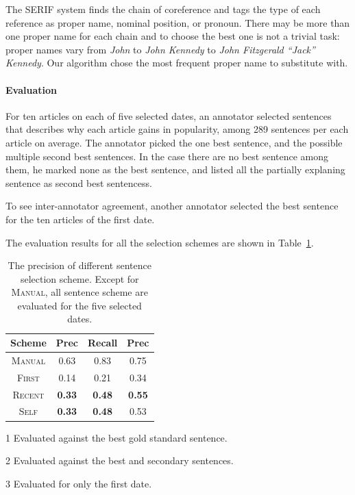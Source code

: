 \documentclass[11pt]{article}
\begin{document}
The SERIF system finds the chain of coreference and tags the type of each reference
as proper name, nominal position, or pronoun.
There may be more than one proper name for each chain and to choose the best one
is not a trivial task: proper names vary from \textit{John} to \textit{John Kennedy} to \textit{John Fitzgerald ``Jack'' Kennedy}.
Our algorithm chose the most frequent proper name to substitute with.

\paragraph {Evaluation}
For ten articles on each of five selected dates, an annotator selected sentences that describes why each article gains in popularity,
among 289 sentences per each article on average.
The annotator picked the one best sentence, and the possible multiple second best sentences.
In the case there are no best sentence among them, he marked none as the best sentence,
and listed all the partially explaning sentence as second best sentencess.

To see inter-annotator agreement, another annotator selected the best sentence for the ten articles of the first date.

The evaluation results for all the selection schemes are shown in Table~\ref{tab:sentence-selection-results}.

\begin{table}
	\centering
	\begin{threeparttable}
		\begin{varwidth}{\textwidth}
			\begin{tabular}{cccc}
				Scheme & Prec\tnote{1} & Recall\tnote{1} & Prec\tnote{2} \\
				\hline
				\textsc{Manual}\tnote{3} & \small 0.63 & \small 0.83 & \small 0.75 \\
				\hline
				\textsc{First} & \small 0.14 & \small 0.21 & \small 0.34 \\
				\textsc{Recent} & \small \textbf{0.33} & \small \textbf{0.48} & \small \textbf{0.55} \\
				\textsc{Self} & \small \textbf{0.33} & \small \textbf{0.48} & \small 0.53 \\
			\end{tabular}
		\end{varwidth}
		\begin{tablenotes}\footnotesize
			\begin{varwidth}{\textwidth}
				\item[1]{ Evaluated against the best gold standard sentence. }
				\item[2]{ Evaluated against the best and secondary sentences. }
				\item[3]{ Evaluated for only the first date. }
			\end{varwidth}
		\end{tablenotes}
		\caption{The precision of different sentence selection scheme. Except for \textsc{Manual},
		all sentence scheme are evaluated for the five selected dates. }
		\label{tab:sentence-selection-results}
	\end{threeparttable}
\end{table}
\end{document}

